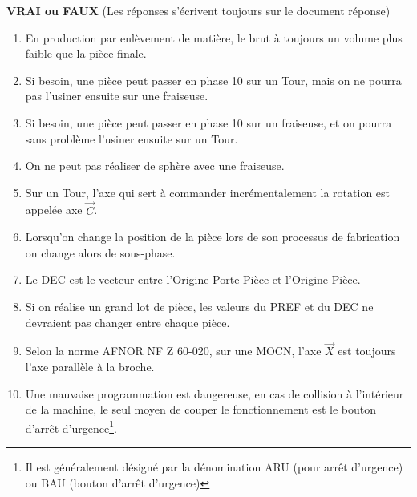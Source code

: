 \documentclass[12pt]{article}
\newcounter{exo}
\newenvironment{exo}{\stepcounter{exo}\vspace{0.5cm}{\bfseries Question \theexo\ :}}{\par\vspace{0.5cm}}
\begin{document}
\begin{center}
\end{center}


\begin{exo} \textbf{VRAI ou FAUX} (Les réponses s'écrivent toujours sur le document réponse)\end{exo} 
\begin{enumerate}[1)]
    \item En production par enlèvement de matière, le brut à toujours un volume plus faible que la pièce finale.
    \item Si besoin, une pièce peut passer en phase 10 sur un Tour, mais on ne pourra pas l'usiner ensuite sur une fraiseuse.
    \item Si besoin, une pièce peut passer en phase 10 sur un fraiseuse, et on pourra sans problème l'usiner ensuite sur un Tour. 
    \item On ne peut pas réaliser de sphère avec une fraiseuse.
    \item Sur un Tour, l'axe qui sert à commander incrémentalement la rotation est appelée axe $\Vec{C}$.
    \item Lorsqu'on change la position de la pièce lors de son processus de fabrication on change alors de sous-phase.
    \item Le DEC est le vecteur entre l'Origine Porte Pièce et l'Origine Pièce.
    \item Si on réalise un grand lot de pièce, les valeurs du PREF et du DEC ne devraient pas changer entre chaque pièce.
    \item Selon la norme AFNOR NF Z 60-020, sur une MOCN, l'axe $\Vec{X}$ est toujours l'axe parallèle à la broche.
    \item Une mauvaise programmation est dangereuse, en cas de collision à l'intérieur de la machine, le seul moyen de couper le fonctionnement est le bouton d'arrêt d'urgence\footnote{Il est généralement désigné par la dénomination ARU (pour arrêt d'urgence) ou BAU (bouton d'arrêt d'urgence)}.
\end{enumerate}
\end{document}
